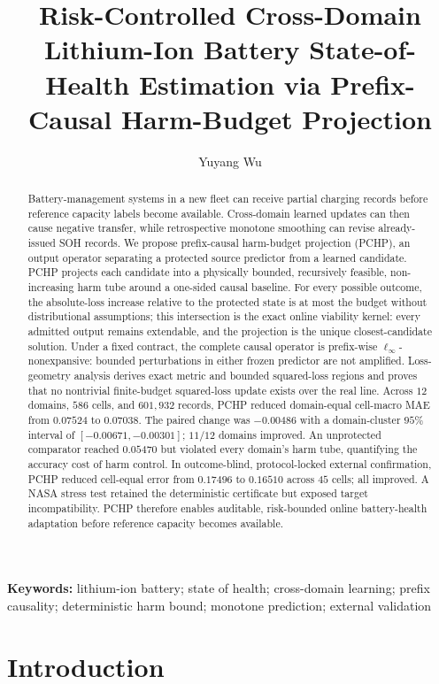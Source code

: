 \documentclass[11pt]{article}
\title{\textbf{Risk-Controlled Cross-Domain Lithium-Ion Battery State-of-Health Estimation via Prefix-Causal Harm-Budget Projection}}
\author{Yuyang Wu}
\date{}
\begin{document}
\maketitle

\begin{abstract}
Battery-management systems in a new fleet can receive partial charging records before reference capacity labels become available. Cross-domain learned updates can then cause negative transfer, while retrospective monotone smoothing can revise already-issued SOH records. We propose prefix-causal harm-budget projection (PCHP), an output operator separating a protected source predictor from a learned candidate. PCHP projects each candidate into a physically bounded, recursively feasible, non-increasing harm tube around a one-sided causal baseline. For every possible outcome, the absolute-loss increase relative to the protected state is at most the budget without distributional assumptions; this intersection is the exact online viability kernel: every admitted output remains extendable, and the projection is the unique closest-candidate solution. Under a fixed contract, the complete causal operator is prefix-wise $\ell_\infty$-nonexpansive: bounded perturbations in either frozen predictor are not amplified. Loss-geometry analysis derives exact metric and bounded squared-loss regions and proves that no nontrivial finite-budget squared-loss update exists over the real line. Across $12$ domains, $586$ cells, and $601{,}932$ records, PCHP reduced domain-equal cell-macro MAE from $0.07524$ to $0.07038$. The paired change was $-0.00486$ with a domain-cluster $95\%$ interval of $[-0.00671,-0.00301]$; $11/12$ domains improved. An unprotected comparator reached $0.05470$ but violated every domain's harm tube, quantifying the accuracy cost of harm control. In outcome-blind, protocol-locked external confirmation, PCHP reduced cell-equal error from $0.17496$ to $0.16510$ across $45$ cells; all improved. A NASA stress test retained the deterministic certificate but exposed target incompatibility. PCHP therefore enables auditable, risk-bounded online battery-health adaptation before reference capacity becomes available.
\end{abstract}

\noindent\textbf{Keywords:} lithium-ion battery; state of health; cross-domain learning; prefix causality; deterministic harm bound; monotone prediction; external validation

\section{Introduction}
\end{document}
